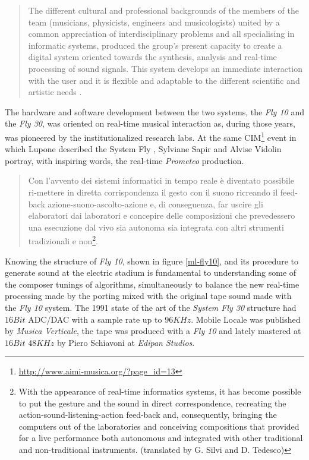 \documentclass[twoside,a4paper]{article}
\begin{document}

\begin{quote}
The different cultural and professional backgrounds of the members of the team
(musicians, physicists, engineers and musicologists) united by a common
appreciation of interdisciplinary problems and all specialising in informatic
systems, produced the group's present capacity to create a digital system
oriented towards the synthesis, analysis and real-time processing of sound
signals. This system develops an immediate interaction with the user and it is
flexible and adaptable to the different scientific and artistic needs \cite{ml91}.
\end{quote}

The hardware and software development between the two systems, the \emph{Fly 10}
and the \emph{Fly 30}, was oriented on real-time musical interaction as, during
those years, was pioneered by the institutionalized research labs. At the same
CIM\footnote{\url{http://www.aimi-musica.org/?page_id=13}} event in which Lupone
described the System Fly \cite{ml85}, Sylviane Sapir and Alvise Vidolin
\cite{savi85} portray, with inspiring words, the real-time \emph{Prometeo}
production.

\begin{quote}
Con l'avvento dei sistemi informatici in tempo reale è diventato possibile
ri-mettere in diretta corrispondenza il gesto con il suono ricreando il feed-back
azione-suono-ascolto-azione e, di conseguenza, far uscire gli elaboratori dai
laboratori e concepire delle composizioni che prevedessero una esecuzione dal
vivo sia autonoma sia integrata con altri strumenti tradizionali e
non\footnote{With the appearance of real-time informatics systems, it has become
possible to put the gesture and the sound in direct correspondence, recreating
the action-sound-listening-action feed-back and, consequently, bringing the
computers out of the laboratories and conceiving compositions that provided for a
live performance both autonomous and integrated with other traditional and
non-traditional instruments. (translated by G. Silvi and D. Tedesco)}.
\end{quote}

Knowing the structure of \emph{Fly 10}, shown in figure \ref{ml-fly10}, and its
procedure to generate sound at the electric stadium is fundamental to understanding
some of the composer tunings of algorithms,  simultaneously to balance the new
real-time processing made by the porting mixed with the original tape sound made
with the \emph{Fly 10} system. The 1991 state of the art of the \emph{System Fly
30} structure had $16Bit$ ADC/DAC with a sample rate up to $96KHz$. Mobile Locale
was published by \emph{Musica Verticale}, the tape was produced with a \emph{Fly 10}
and lately mastered at $16Bit$ $48KHz$ by Piero Schiavoni at \emph{Edipan Studios}.
\end{document}
